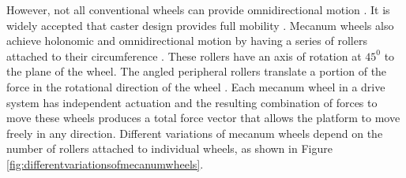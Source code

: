 However, not all conventional wheels can provide omnidirectional motion \cite{muir_kinematic_1987, alexander_kinematics_1989, ostrovskaya_nonholonomic_1998}. It is widely accepted that caster design provides full mobility \cite{d39_structural_1996}. Mecanum wheels also achieve holonomic and omnidirectional motion by having a series of rollers attached to their circumference \cite{diegel_improved_nodate}. These rollers have an axis of rotation at $45^0$ to the plane of the wheel. The angled peripheral rollers translate a portion of the force in the rotational direction of the wheel \cite{diegel_improved_nodate}. Each mecanum wheel in a drive system has independent actuation and the resulting combination of forces to move these wheels produces a total force vector that allows the platform to move freely in any direction. Different variations of mecanum wheels depend on the number of rollers attached to individual wheels, as shown in Figure \ref{fig:differentvariationsofmecanumwheels}.

